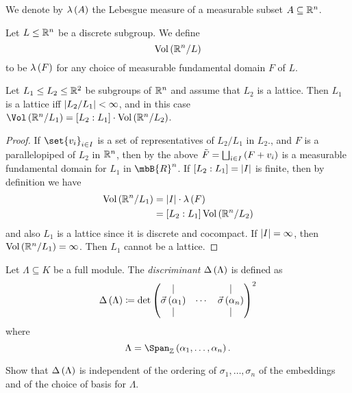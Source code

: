 \documentclass[11pt]{karticle}
\begin{document}

\begin{notation}
We denote by $\lambda\left( A \right)$ the Lebesgue measure of a measurable subset $A \subseteq \mathbb{R}^n$.
\end{notation}

\begin{definition}
Let $L \leq \mathbb{R}^n$ be a discrete subgroup.
We define
\[\mathrm{Vol}\left( \mathbb{R}^n / L \right)\]
to be $\lambda\left( F \right)$ for any choice of measurable fundamental domain $F$ of $L$.
\end{definition}

\begin{corollary}
Let $L_1 \leq L_2 \leq \mathbb{R}^2$ be subgroups of $\mathbb{R}^n$ and assume that $L_2$ is a lattice. Then $L_1$ is a lattice iff $\left| L_2 / L_1 \right| < \infty$, and in this case $\Vol\prs{\mbb{R}^n / L_1} = \brs{L_2 : L_1} \cdot \mrm{Vol}\prs{\mbb{R}^n / L_2}$.
\end{corollary}

\begin{proof}
If $\set{v_i}_{i \in I}$ is a set of representatives of $L_2 / L_1$ in $L_2$., and $F$ is a parallelopiped of $L_2$ in $\mathbb{R}^n$, then by the above $\tilde{F} = \bigsqcup_{i \in I} \left( F + v_i \right)$ is a measurable fundamental domain for $L_1$ in $\mbB{R}^n$. If $\left[ L_2 : L_1 \right] = \left| I \right|$ is finite, then by definition we have
\begin{align*}
\mathrm{Vol}\left( \mathbb{R}^n / L_1 \right) &= \left| I \right| \cdot \lambda\left( F \right) \\
&= \left[ L_2 : L_1 \right] \mathrm{Vol}\left( \mathbb{R}^n / L_2 \right)
\end{align*}
and also $L_1$ is a lattice since it is discrete and cocompact.
If $\left| I \right| = \infty$, then $\mathrm{Vol}\left( \mathbb{R}^n / L_1 \right) = \infty$. Then $L_1$ cannot be a lattice.
\end{proof}

\begin{definition}
Let $\Lambda \subseteq K$ be a full module. The \emph{discriminant} $\Delta\left( \Lambda \right)$ is defined as
\[\Delta\left( \Lambda \right) \coloneqq \det\begin{pmatrix}\vert & & \vert \\ \vec{\sigma}\left( \alpha_1 \right) & \cdots & \vec{\sigma}\left( \alpha_n \right) \\ \vert & & \vert\end{pmatrix}^2\]
where
\[\Lambda = \Span_{\mbb{Z}}\prs{\alpha_1, \ldots, \alpha_n} \text{.}\]
\end{definition}

\begin{exercise}
Show that $\Delta\left( \Lambda \right)$ is independent of the ordering of $\sigma_1, \ldots, \sigma_n$ of the embeddings and of the choice of basis for $\Lambda$.
\end{exercise}
\end{document}

